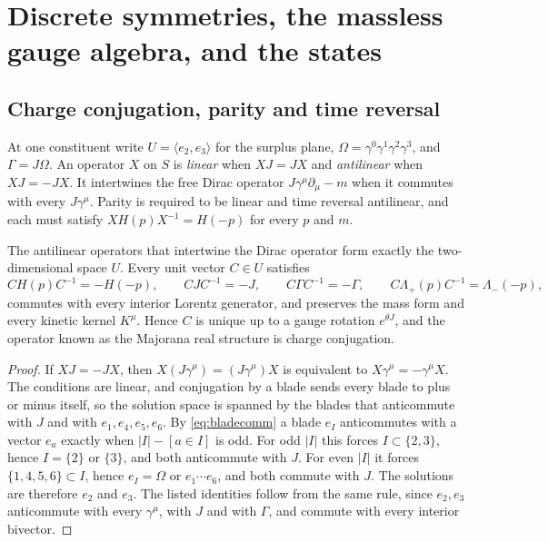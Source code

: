 \section{Discrete symmetries, the massless gauge algebra, and the states}
\label{sec:discrete}

\subsection{Charge conjugation, parity and time reversal}

At one constituent write $U=\langle e_2,e_3\rangle$ for the surplus plane, $\Omega=\gamma^0\gamma^1\gamma^2\gamma^3$, and
$\Gamma=J\Omega$. An operator $X$ on $S$ is \emph{linear} when $XJ=JX$ and \emph{antilinear} when $XJ=-JX$. It intertwines the free
Dirac operator $J\gamma^\mu\partial_\mu-m$ when it commutes with every $J\gamma^\mu$. Parity is required to be linear and time
reversal antilinear, and each must satisfy $XH(p)X^{-1}=H(-p)$ for every $p$ and $m$.

\begin{theorem}
\label{thm:C}
The antilinear operators that intertwine the Dirac operator form exactly the two-dimensional space $U$. Every unit vector $C\in U$
satisfies
\[
CH(p)C^{-1}=-H(-p),\qquad CJC^{-1}=-J,\qquad C\Gamma C^{-1}=-\Gamma,\qquad C\Lambda_+(p)C^{-1}=\Lambda_-(-p),
\]
commutes with every interior Lorentz generator, and preserves the mass form and every kinetic kernel $K^\mu$. Hence $C$ is unique up
to a gauge rotation $e^{\theta J}$, and the operator known as the Majorana real structure is charge conjugation.
\end{theorem}

\begin{proof}
If $XJ=-JX$, then $X(J\gamma^\mu)=(J\gamma^\mu)X$ is equivalent to $X\gamma^\mu=-\gamma^\mu X$. The conditions are linear, and
conjugation by a blade sends every blade to plus or minus itself, so the solution space is spanned by the blades that anticommute
with $J$ and with $e_1,e_4,e_5,e_6$. By \eqref{eq:bladecomm} a blade $e_I$ anticommutes with a vector $e_a$ exactly when
$|I|-[a\in I]$ is odd. For odd $|I|$ this forces $I\subset\{2,3\}$, hence $I=\{2\}$ or $\{3\}$, and both anticommute with $J$. For
even $|I|$ it forces $\{1,4,5,6\}\subset I$, hence $e_I=\Omega$ or $e_1\cdots e_6$, and both commute with $J$. The solutions are
therefore $e_2$ and $e_3$. The listed identities follow from the same rule, since $e_2,e_3$ anticommute with every $\gamma^\mu$, with
$J$ and with $\Gamma$, and commute with every interior bivector.
\end{proof}

